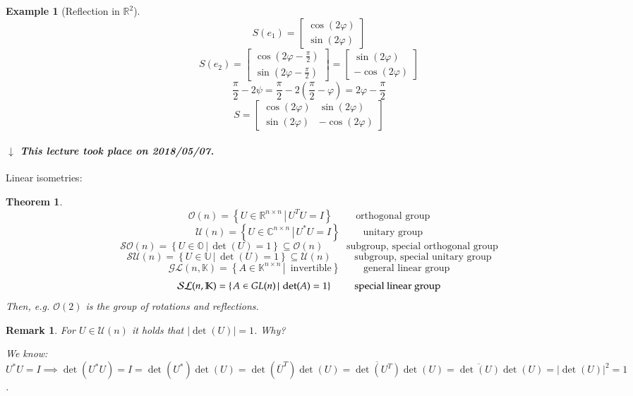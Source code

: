 \documentclass{article}
\newtheorem{theorem}{Theorem}  \numberwithin{theorem}{section}
\newtheorem{example}{Example}  \numberwithin{example}{section}
\newtheorem{remark}{Remark}  \numberwithin{remark}{section}
\newcommand{\setdef}[2]{\left\{\left.#1\,\right|\,#2\right\}}
\newcommand{\card}[1]{\left|#1\right|}
\newcommand{\dateref}[1]{%
  \begin{mdframed}[backgroundcolor=gray!10,innerbottommargin=0pt,innertopmargin=0pt]
    \paragraph{\textit{$\downarrow$ This lecture took place on #1.}}%
  \end{mdframed}%
}
\begin{document}
\begin{example}[Reflection in $\mathbb R^2$]
  \[ S(e_1) = \begin{bmatrix} \cos(2\varphi) \\ \sin(2\varphi) \end{bmatrix} \]
  \[ S(e_2) = \begin{bmatrix} \cos(2\varphi - \frac\pi2) \\ \sin(2\varphi - \frac\pi2) \end{bmatrix} = \begin{bmatrix} \sin(2\varphi) \\ -\cos(2\varphi) \end{bmatrix} \]
  \[ \frac\pi2 - 2\psi = \frac\pi2 - 2(\frac\pi2 - \varphi) = 2\varphi - \frac\pi2 \]
  \[ S = \begin{bmatrix} \cos(2\varphi) & \sin(2\varphi) \\ \sin(2\varphi) & -\cos(2\varphi) \end{bmatrix} \]
\end{example}


\dateref{2018/05/07}

Linear isometries:

\begin{theorem} %
  \[ \mathcal O(n) = \setdef{U \in \mathbb R^{n\times n}}{U^TU = I} \qquad \text{ orthogonal group} \]
  \[ \mathcal U(n) = \setdef{U \in \mathbb C^{n\times n}}{U^*U = I} \qquad \text{ unitary group} \]
  \[ \mathcal{SO}(n) = \setdef{U \in \mathbb O}{\det(U) = 1} \subseteq \mathcal O(n) \qquad \text{ subgroup, special orthogonal group} \]
  \[ \mathcal{SU}(n) = \setdef{U \in \mathbb U}{\det(U) = 1} \subseteq \mathcal U(n) \qquad \text{ subgroup, special unitary group} \]
  \[ \mathcal{GL}(n, \mathbb K) = \setdef{A \in \mathbb K^{n\times n}}{\text{ invertible}} \qquad \text{ general linear group} \]
  \[ \mathcal{SL}(n, \mathbb K) = \setdef{A \in \mathbb \mathcal{GL}(n)}{\det(A) = 1} \qquad \text{ special linear group} \]
  Then, e.g. $\mathcal O(2)$ is the group of rotations and reflections.
\end{theorem}

\begin{remark}
  For $U \in \mathcal U(n)$ it holds that $\card{\det(U)} = 1$. Why?

  We know: $U^* U = I \implies \det(U^* U) = I = \det(U^*) \det(U) = \det(\overline{U}^T) \det(U) = \overline{\det(U^T)} \det(U) = \overline{\det(U)} \det(U) = \card{\det(U)}^2 = 1$.
\end{remark}
\end{document}
